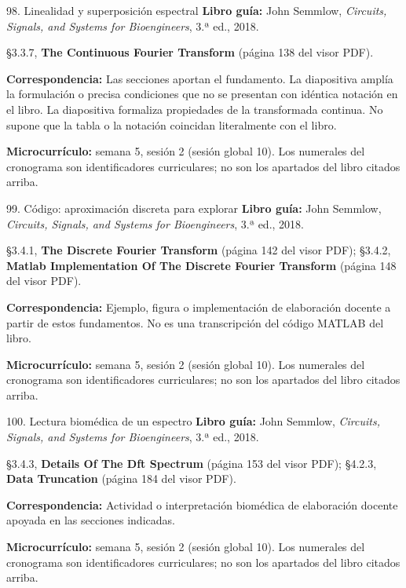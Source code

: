 \documentclass[
  10pt,
  ignorenonframetext,
  aspectratio=169,
  spanish,
]{beamer}
\begin{document}
\begin{frame}{98. Linealidad y superposición espectral}
\label{linealidad-y-superposiciuxf3n-espectral}
\textbf{Libro guía:} John Semmlow, \emph{Circuits, Signals, and Systems
for Bioengineers}, 3.ª ed., 2018.

§3.3.7, \textbf{The Continuous Fourier Transform} (página 138 del visor
PDF).

\textbf{Correspondencia:} Las secciones aportan el fundamento. La
diapositiva amplía la formulación o precisa condiciones que no se
presentan con idéntica notación en el libro. La diapositiva formaliza
propiedades de la transformada continua. No supone que la tabla o la
notación coincidan literalmente con el libro.

\textbf{Microcurrículo:} semana 5, sesión 2 (sesión global 10). Los
numerales del cronograma son identificadores curriculares; no son los
apartados del libro citados arriba.
\end{frame}

\begin{frame}{99. Código: aproximación discreta para explorar}
\label{cuxf3digo-aproximaciuxf3n-discreta-para-explorar}
\textbf{Libro guía:} John Semmlow, \emph{Circuits, Signals, and Systems
for Bioengineers}, 3.ª ed., 2018.

§3.4.1, \textbf{The Discrete Fourier Transform} (página 142 del visor
PDF); §3.4.2, \textbf{Matlab Implementation Of The Discrete Fourier
Transform} (página 148 del visor PDF).

\textbf{Correspondencia:} Ejemplo, figura o implementación de
elaboración docente a partir de estos fundamentos. No es una
transcripción del código MATLAB del libro.

\textbf{Microcurrículo:} semana 5, sesión 2 (sesión global 10). Los
numerales del cronograma son identificadores curriculares; no son los
apartados del libro citados arriba.
\end{frame}

\begin{frame}{100. Lectura biomédica de un espectro}
\label{lectura-biomuxe9dica-de-un-espectro}
\textbf{Libro guía:} John Semmlow, \emph{Circuits, Signals, and Systems
for Bioengineers}, 3.ª ed., 2018.

§3.4.3, \textbf{Details Of The Dft Spectrum} (página 153 del visor PDF);
§4.2.3, \textbf{Data Truncation} (página 184 del visor PDF).

\textbf{Correspondencia:} Actividad o interpretación biomédica de
elaboración docente apoyada en las secciones indicadas.

\textbf{Microcurrículo:} semana 5, sesión 2 (sesión global 10). Los
numerales del cronograma son identificadores curriculares; no son los
apartados del libro citados arriba.
\end{frame}
\end{document}
